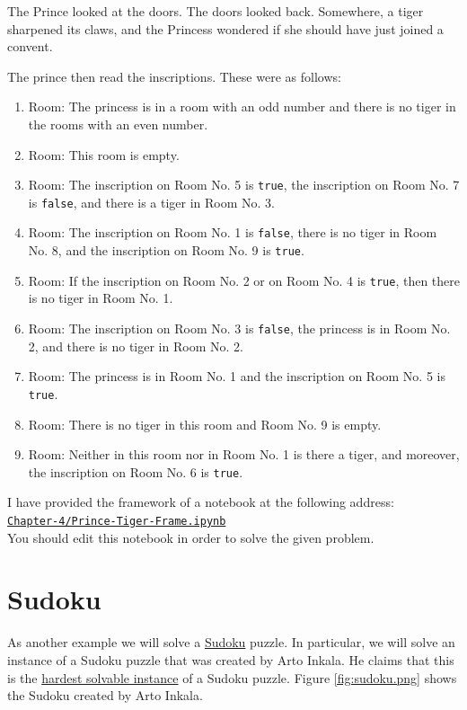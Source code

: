 The Prince looked at the doors. The doors looked back. Somewhere, a tiger sharpened its claws, and the Princess
wondered if she should have just joined a convent.

The prince then read the inscriptions. These were as follows:
\begin{enumerate}
\item Room: The princess is in a room with an odd number and
      there is no tiger in the rooms with an even number.
\item Room: This room is empty.
\item Room: The inscription on Room No. 5 is \texttt{true}, the inscription on Room No. 7 is \texttt{false},
      and there is a tiger in Room No. 3.
\item Room: The inscription on Room No. 1 is \texttt{false}, there is no tiger in Room No. 8,
      and the inscription on Room No. 9 is \texttt{true}.
\item Room: If the inscription on Room No. 2 or on Room No. 4 is \texttt{true},
      then there is no tiger in Room No. 1.
\item Room: The inscription on Room No. 3 is \texttt{false}, the princess is in Room No. 2,
      and there is no tiger in Room No. 2.
\item Room: The princess is in Room No. 1 and the inscription on Room No. 5 is \texttt{true}.
\item Room: There is no tiger in this room and Room No. 9 is empty.
\item Room: Neither in this room nor in Room No. 1 is there a tiger, and moreover, the
      inscription on Room No. 6 is \texttt{true}.
\end{enumerate} 
I have provided the framework of a notebook at the following address:
\\[0.2cm]
\hspace*{1.3cm}
\href{https://github.com/karlstroetmann/Logic/blob/master/Java/Chapter-4/Prince-Tiger-Frame.ipynb}{\texttt{Chapter-4/Prince-Tiger-Frame.ipynb}}
\\[0.2cm]
You should edit this notebook in order to solve the given problem. \eox
\vspace*{1cm}


\section{Sudoku}
As another example we will solve a \href{https://en.wikipedia.org/wiki/Sudoku}{Sudoku} puzzle.  In particular,
we will solve an instance of a Sudoku puzzle that was created by Arto Inkala.  He claims that this is the
\href{https://abcnews.go.com/blogs/headlines/2012/06/can-you-solve-the-hardest-ever-sudoku}{hardest solvable instance}
of a Sudoku puzzle.  Figure \ref{fig:sudoku.png} shows the Sudoku created by Arto Inkala.

